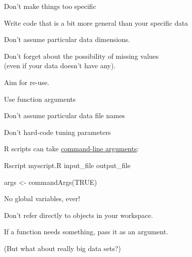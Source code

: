 \documentclass[12pt,t]{beamer}
\begin{document}
\begin{frame}{Don't make things too specific}

\bbi
\item Write code that is a bit more general than your specific data
  \bi
  \item Don't assume particular data dimensions.
  \item Don't forget about the possibility of missing values\\
    (even if {\hilit your} data doesn't have any).
  \item Aim for re-use.
  \ei
\item Use function arguments
  \bi
  \item Don't assume particular data file names
  \item Don't hard-code tuning parameters
  \item R scripts can take \href{http://stackoverflow.com/questions/2151212/how-can-i-read-command-line-parameters-from-an-r-script}{command-line arguments}:\\[2pt]
    \bi
    \item[] {\ttsm Rscript myscript.R input\_file output\_file} \\[2pt]
    \item[] {\ttsm args <- commandArgs(TRUE)}
    \ei
  \ei
\ei

\end{frame}



\begin{frame}{No global variables, ever!}

\bbi
\item Don't refer directly to objects in your workspace.
\item If a function needs something, pass it as an argument.
\item (But what about really big data sets?)
\ei

\end{frame}
\end{document}
